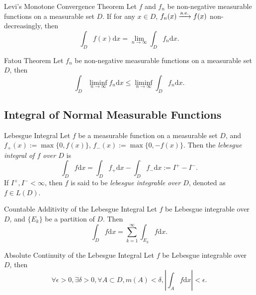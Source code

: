 \begin{theorem}{Levi's Monotone Convergence Theorem}{}
  Let $f$ and $f_n$ be non-negative measurable functions on a measurable set
  $D$.
  If for any $x \in D$, $f_n(x) \xrightarrow{\text{a.e.}} f(x)$ non-decreasingly, then
  \begin{equation}
    \int_D f(x)\mathrm{d} x = \lim \limits _{n \rightarrow \infty} \int_D f_n\mathrm{d} x.
  \end{equation}
\end{theorem}

\begin{theorem}{Fatou Theorem}{}
  Let $f_n$ be non-negative measurable functions on a measurable set $D$,
  then
  \begin{equation}
    \int_D \liminf \limits_{n \rightarrow \infty} f_n\mathrm{d} x
    \leq \liminf \limits_{n \rightarrow \infty} \int_D f_n\mathrm{d} x.
  \end{equation}
\end{theorem}

\subsection{Integral of Normal Measurable Functions}

\begin{definition}{Lebesgue Integral}{}
  Let $f$ be a measurable function on a measurable set $D$,
  and $f_+(x) := \max\{0, f(x)\}$, $f_-(x) := \max\{0, -f(x)\}$.
  Then the \emph{lebesgue integral of $f$ over $D$} is
  \begin{equation}
    \int_D f \mathrm{d} x 
    = \int_D f_+ \mathrm{d} x - \int_D f_-\mathrm{d} x
    := I^+ - I^-.
  \end{equation}
  If $I^+, I^- < \infty$, then $f$ is said to be \emph{lebesgue integrable over
    $D$}, denoted as $f \in L(D)$.
\end{definition}

\begin{theorem}{Countable Additivity of the Lebesgue Integral}{}
  Let $f$ be Lebesgue integrable over $D$,
  and $\{E_k\}$ be a partition of $D$. Then
  \begin{equation}
    \int_D f \mathrm{d} x = \sum\limits_{k = 1}^{\infty} \int_{E_k} f \mathrm{d} x.
  \end{equation}
\end{theorem}

\begin{theorem}{Absolute Continuity of the Lebesgue Integral}{}
  Let $f$ be Lebesgue integrable over $D$,
  then
  \begin{equation}
    \forall \epsilon > 0, \exists \delta > 0, \forall A \subset D,
    m(A) < \delta, \left| \int_A f \mathrm{d} x \right| < \epsilon.
  \end{equation}
\end{theorem}

